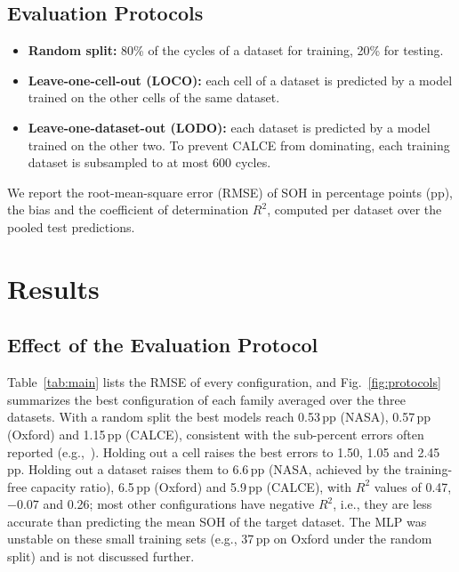 \documentclass[conference]{IEEEtran}
\begin{document}
\subsection{Evaluation Protocols}
\begin{itemize}
\item \textbf{Random split:} 80\% of the cycles of a dataset for training, 20\% for testing.
\item \textbf{Leave-one-cell-out (LOCO):} each cell of a dataset is predicted by a model trained on the other cells of the same dataset.
\item \textbf{Leave-one-dataset-out (LODO):} each dataset is predicted by a model trained on the other two. To prevent CALCE from dominating, each training dataset is subsampled to at most 600 cycles.
\end{itemize}
We report the root-mean-square error (RMSE) of SOH in percentage points (pp), the bias and the coefficient of determination $R^2$, computed per dataset over the pooled test predictions.

\section{Results}
\subsection{Effect of the Evaluation Protocol}
Table~\ref{tab:main} lists the RMSE of every configuration, and Fig.~\ref{fig:protocols} summarizes the best configuration of each family averaged over the three datasets. With a random split the best models reach 0.53\,pp (NASA), 0.57\,pp (Oxford) and 1.15\,pp (CALCE), consistent with the sub-percent errors often reported (e.g.,~\cite{roman2021pipeline}). Holding out a cell raises the best errors to 1.50, 1.05 and 2.45\,pp. Holding out a dataset raises them to 6.6\,pp (NASA, achieved by the training-free capacity ratio), 6.5\,pp (Oxford) and 5.9\,pp (CALCE), with $R^2$ values of 0.47, $-0.07$ and 0.26; most other configurations have negative $R^2$, i.e., they are less accurate than predicting the mean SOH of the target dataset. The MLP was unstable on these small training sets (e.g., 37\,pp on Oxford under the random split) and is not discussed further.
\end{document}
